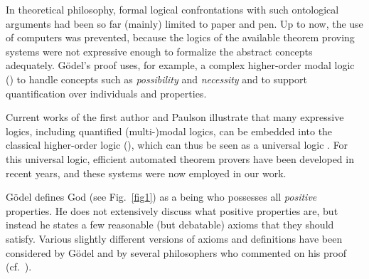 \documentclass{ecai2014}
\newcommand\entity[1]{\text{\textrm{#1}}}
\def\HOML{\entity{HOML}\xspace}
\def\HOL{\entity{HOL}\xspace}
\begin{document}
In theoretical philosophy, formal logical confrontations with such
ontological arguments had been so far (mainly) limited to paper
and pen.  Up to now, the use of computers was prevented, because the
logics of the available theorem proving systems were not expressive
enough to formalize the abstract concepts adequately. G{\"o}del's proof
uses, for example, a complex higher-order modal logic (\HOML) to handle
concepts such as \emph{possibility} and \emph{necessity} and to support
quantification over individuals and properties.

Current works \cite{J23,B9} of the first author and Paulson illustrate that many
expressive logics, including quantified (multi-)modal logics, can be
embedded into the classical higher-order logic (\HOL), which can thus be seen
as a universal logic \cite{C36}. For this universal logic, efficient automated
theorem provers have been developed in recent years, and these systems
were now employed in our work.

G\"{o}del defines God (see Fig.~\ref{fig1}) as a being who possesses all \emph{positive}
properties.  He does not extensively discuss what positive properties
are, but instead he states a few reasonable (but debatable) axioms
that they should satisfy.  Various slightly different versions of
axioms and definitions have been considered by G\"{o}del and by
several philosophers who commented on his proof
(cf.~\cite{sobel2004logic,anderson90:_some_emend_of_goedel_ontol_proof,AndersonGettings,Fitting,Adams,ContemporaryBibliography}).
\end{document}

